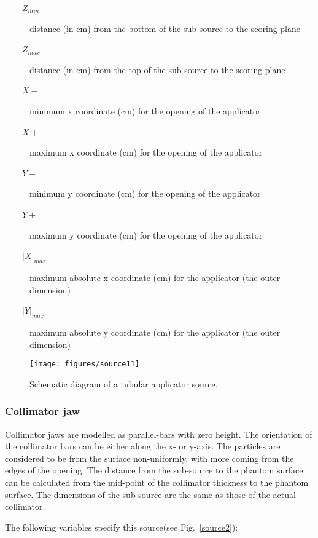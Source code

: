 \documentclass[12pt,twoside]{article}
\begin{document}
\begin{description}
\item [~~~~$Z_{min}$] distance (in cm) from the bottom of the sub-source to the scoring plane
\item [~~~~$Z_{max}$] distance (in cm) from the top of the sub-source to the scoring plane
\item [~~~~$X-$] minimum x coordinate (cm) for the opening of the applicator
\item [~~~~$X+$] maximum x coordinate (cm) for the opening of the applicator
\item [~~~~$Y-$] minimum y coordinate (cm) for the opening of the applicator
\item [~~~~$Y+$] maximum y coordinate (cm) for the opening of the applicator
\item [~~~~$|X|_{max}$] maximum absolute x coordinate (cm) for the applicator (the outer dimension)
\item [~~~~$|Y|_{max}$] maximum absolute y coordinate (cm) for the applicator (the outer dimension)
\end{description}
\begin{figure}[htbp]
\begin{center}
\leavevmode
\mbox{}\hspace{0cm}
\vspace*{5cm}
\texttt{[image: figures/source11]}
\caption[] {Schematic diagram of a tubular applicator source. }
\label{source11}
\end{center}
\end{figure}
\subsubsection{Collimator jaw}
Collimator jaws are modelled as parallel-bars with zero height. The orientation of the collimator bars can be either along the x- or y-axis. The particles are considered to be from the surface non-uniformly, with more coming from the edges of the opening. The distance from the sub-source to the phantom surface can be calculated from the mid-point of the collimator thickness to the phantom surface. The dimensions of the sub-source are the same as those of the actual collimator.

The following variables specify this source(see Fig.~\ref{source2}):
\end{document}
